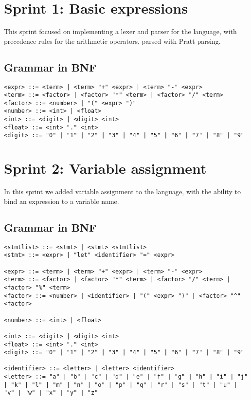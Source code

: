 \section{Sprint 1: Basic expressions}\label{sec:sprint-1:-basic-expressions}

This sprint focused on implementing a lexer and parser for the language, with precedence rules for the arithmetic 
operators, parsed with Pratt parsing.

\subsection{Grammar in BNF}\label{subsec:grammar-in-bnf1}

\begin{verbatim}
<expr> ::= <term> | <term> "+" <expr> | <term> "-" <expr>
<term> ::= <factor> | <factor> "*" <term> | <factor> "/" <term>
<factor> ::= <number> | "(" <expr> ")"
<number> ::= <int> | <float>
<int> ::= <digit> | <digit> <int>
<float> ::= <int> "." <int>
<digit> ::= "0" | "1" | "2" | "3" | "4" | "5" | "6" | "7" | "8" | "9"
\end{verbatim}

\section{Sprint 2: Variable assignment}\label{sec:variable-assignment}

In this sprint we added variable assignment to the language, with the ability to bind an expression to a variable name.

\subsection{Grammar in BNF}\label{subsec:grammar-in-bnf2}

\begin{verbatim}
<stmtlist> ::= <stmt> | <stmt> <stmtlist>
<stmt> ::= <expr> | "let" <identifier> "=" <expr>

<expr> ::= <term> | <term> "+" <expr> | <term> "-" <expr>
<term> ::= <factor> | <factor> "*" <term> | <factor> "/" <term> | <factor> "%" <term>
<factor> ::= <number> | <identifier> | "(" <expr> ")" | <factor> "^" <factor>

<number> ::= <int> | <float>

<int> ::= <digit> | <digit> <int>
<float> ::= <int> "." <int>
<digit> ::= "0" | "1" | "2" | "3" | "4" | "5" | "6" | "7" | "8" | "9"

<identifier> ::= <letter> | <letter> <identifier>
<letter> ::= "a" | "b" | "c" | "d" | "e" | "f" | "g" | "h" | "i" | "j" | "k" | "l" | "m" | "n" | "o" | "p" | "q" | "r" | "s" | "t" | "u" | "v" | "w" | "x" | "y" | "z"
\end{verbatim}

